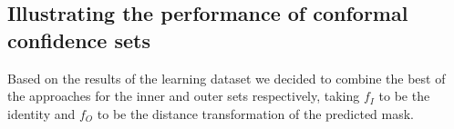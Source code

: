 \begin{figure}
	\label{fig:learning}
\end{figure}



\subsection{Illustrating the performance of conformal confidence sets}\label{SS:val}
Based on the results of the learning dataset we decided to combine the best of the approaches for the inner and outer sets respectively, taking $f_I$ to be the identity and $f_O$ to be the distance transformation of the predicted mask.


